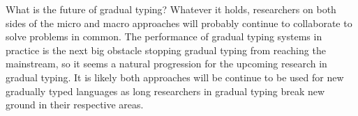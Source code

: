 \documentclass[10pt]{article}
\begin{document}
What is the future of gradual typing?
Whatever it holds, researchers on both sides of the micro and macro approaches will probably
continue to collaborate to solve problems in common.
The performance of gradual typing systems in practice is the next big obstacle stopping gradual
typing from reaching the mainstream, so it seems a natural progression for the upcoming research
in gradual typing.
It is likely both approaches will be continue to be used for new gradually typed languages
as long researchers in gradual typing break new ground in their respective areas.



\end{document}

